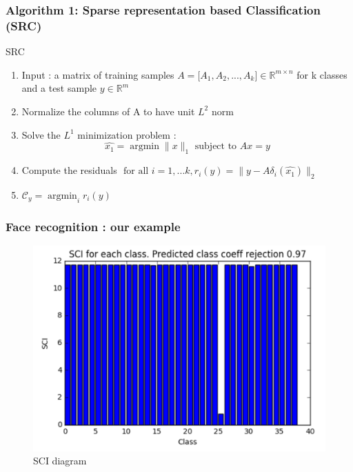 \documentclass{beamer}
\DeclareMathOperator{\argmin}{argmin} %
\begin{document}

\begin{frame}


\frametitle{Algorithm 1: Sparse representation based Classification (SRC)}		
			
\begin{block}{SRC}

	\begin{enumerate}
	
	\item Input : a matrix of training samples $A=\lbrack A_{1},A_{2},...,A_{k} \rbrack \in \mathbb{R}^{m \times n}$ for k classes and a test sample $y \in \mathbb{R}^{m}$
	\item Normalize the columns of A to have unit $L^{2}$ norm
	\item Solve the $L^{1}$ minimization problem :
		$$ \hat{x_{1}}= \argmin \|x\|_{1}  \mbox{ subject to } Ax=y$$
		
	\item Compute the residuals
	$ \mbox{ for all } i=1,...k, r_{i}(y)=\|y-A\delta_{i}(\hat{x_{1}})\|_{2}$
	
	\item $\mathcal{C}_{y}=\argmin_{i} r_{i}(y)$
	
	
	\end{enumerate}



\end{block}

\end{frame}


\begin{frame}
\frametitle{Face recognition : our example}

			\begin{figure}[!ht]
			\begin{center}
			\includegraphics[scale=0.5]{SCI.png}
			\end{center}
			\caption{SCI diagram}
			\label{fa}
			\end{figure}
\end{frame}
\end{document}
